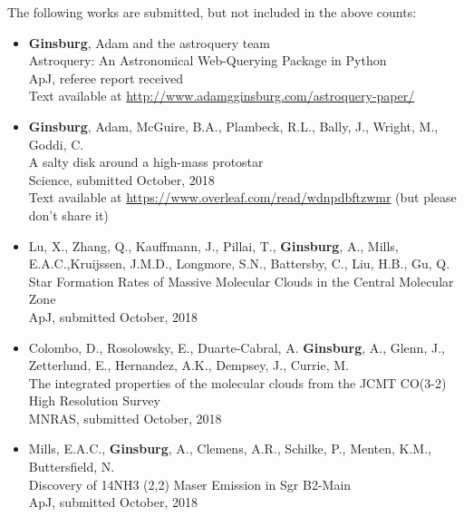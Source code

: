 \vspace{24pt}
The following works are submitted, but not included in the above counts:

\begin{itemize}
    \item \textbf{Ginsburg}, Adam and the astroquery team \\
Astroquery: An Astronomical Web-Querying Package in Python \\
ApJ, referee report received \\ 
Text available at \url{http://www.adamgginsburg.com/astroquery-paper/}

    \item \textbf{Ginsburg}, Adam, McGuire, B.A., Plambeck, R.L., Bally, J., Wright, M., Goddi, C. \\
A salty disk around a high-mass protostar \\
Science, submitted October, 2018 \\
Text available at \url{https://www.overleaf.com/read/wdnpdbftzwmr} (but please don't share it)

\item Lu, X., Zhang, Q., Kauffmann, J.,  Pillai, T.,  
    \textbf{Ginsburg}, A.,  Mills, E.A.C.,Kruijssen, J.M.D., 
    Longmore, S.N.,  Battersby, C.,   Liu, H.B.,  Gu, Q. \\
    Star Formation Rates of Massive Molecular Clouds in the Central Molecular Zone\\
    ApJ, submitted October, 2018

\item Colombo, D.,   Rosolowsky, E., Duarte-Cabral, A. \textbf{Ginsburg}, A.,
    Glenn, J.,  Zetterlund, E., Hernandez, A.K., Dempsey, J., Currie, M. \\
    The integrated properties of the molecular clouds from the JCMT CO(3-2) High Resolution Survey \\
    MNRAS, submitted October, 2018
    
\item Mills, E.A.C., \textbf{Ginsburg}, A., Clemens, A.R., Schilke, P., Menten, K.M., Buttersfield, N. \\
    Discovery of 14NH3 (2,2) Maser Emission in Sgr B2-Main \\
    ApJ, submitted October, 2018

\end{itemize}
